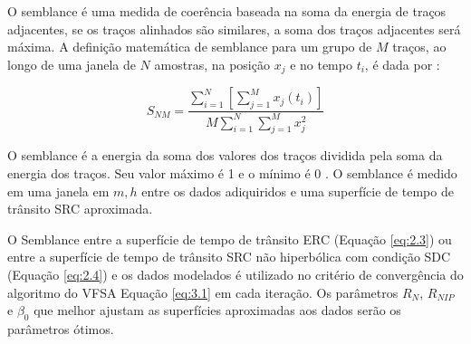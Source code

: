 O semblance é uma medida de coerência baseada na soma da energia de traços adjacentes, se os traços alinhados são similares,
a soma dos traços adjacentes será máxima. A definição matemática de semblance para um grupo de $M$ traços, ao 
longo de uma janela de $N$ amostras, na posição $x_j$ e no tempo $t_i$, é dada por \cite{seg}:

\begin{equation}
\label{eq:3.9}
 S_{NM}=\frac{ \sum_{i=1}^N [\sum_{j=1}^M x_j(t_i)]}{M \sum_{i=1}^N \sum_{j=1}^Mx^2_{j}}
\end{equation}

O semblance é a energia da soma dos valores dos traços dividida pela soma da energia dos traços. 
Seu valor máximo é 1 e o mínimo é 0 \cite{seg}. O semblance é medido em uma janela em $m, h$ entre os dados adiquiridos 
e uma superfície de tempo de
trânsito SRC aproximada. 

O Semblance entre a superfície de tempo de trânsito ERC (Equação \ref{eq:2.3})
ou entre a superfície de tempo de trânsito SRC não hiperbólica com condição SDC (Equação \ref{eq:2.4}) 
e os dados modelados é utilizado no critério de
convergência do algoritmo do VFSA Equação \ref{eq:3.1} em cada iteração. 
Os parâmetros $R_N$, $R_{NIP}$ e $\beta_0$ que melhor
ajustam as superfícies aproximadas aos dados serão os parâmetros ótimos.